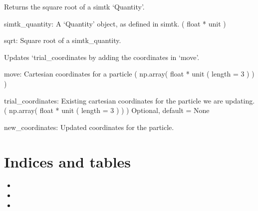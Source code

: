 \documentclass[letterpaper,10pt,english,openany,oneside]{sphinxmanual}
\begin{document}

\begin{fulllineitems}
\label{\detokenize{util:util.unit_sqrt}}
Returns the square root of a simtk ‘Quantity’.

simtk\_quantity: A ‘Quantity’ object, as defined in simtk.
( float * unit )

sqrt: Square root of a simtk\_quantity.

\end{fulllineitems}


\begin{fulllineitems}
\label{\detokenize{util:util.update_trial_coordinates}}
Updates ‘trial\_coordinates by adding the coordinates in ‘move’.

move: Cartesian coordinates for a particle
( np.array( float * unit ( length = 3 ) ) )

trial\_coordinates: Existing cartesian coordinates for the particle
we are updating.
( np.array( float * unit ( length = 3 ) ) )
Optional, default = None

new\_coordinates: Updated coordinates for the particle.

\end{fulllineitems}



\chapter{Indices and tables}
\label{\detokenize{index:indices-and-tables}}\begin{itemize}
\item {} 

\item {} 

\item {} 

\end{itemize}


\renewcommand{\indexname}{Python Module Index}
\begin{sphinxtheindex}
\let\bigletter\sphinxstyleindexlettergroup
\bigletter{i}
\item\relax{}
\indexspace
\bigletter{u}
\item\relax{}
\end{sphinxtheindex}

\renewcommand{\indexname}{Index}
\printindex
\end{document}
